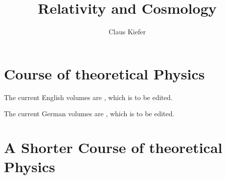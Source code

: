 \documentclass[a4paper]{article}
\title{Relativity and Cosmology}
\author{Claus Kiefer}
\begin{document}
\maketitle



\section{Course of theoretical Physics}

The current English volumes are
\cite{Landau_1986a,Landau_1975a,Landau_1980a,Landau_1980b,Lifshitz_1980a,%
Landau_1977a,Berestetskii_1982a,Lifshitz_1981a,Landau_1976a,Landau_1987a,%
Landau_1984a}, which is to be edited.

The current German volumes are
\cite{Landau_1997,Landau_1992,Landau_2012,Landau1991,Landau_1987,Landau_1991a,%
Landau_1991,Landau_1990,Landau1992,Landau1990}, which is to be edited.

\section{A Shorter Course of theoretical Physics}

\cite{Landau_1974a,Landau_1972a}

\printbibliography
\end{document}
